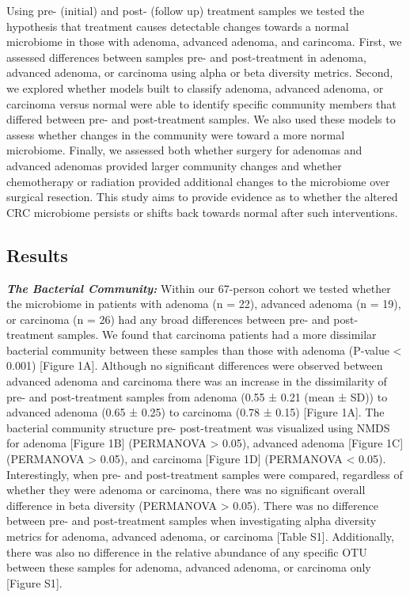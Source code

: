 \documentclass[12pt,]{article}
\begin{document}
Using pre- (initial) and post- (follow up) treatment samples we tested
the hypothesis that treatment causes detectable changes towards a normal
microbiome in those with adenoma, advanced adenoma, and carincoma.
First, we assessed differences between samples pre- and post-treatment
in adenoma, advanced adenoma, or carcinoma using alpha or beta diversity
metrics. Second, we explored whether models built to classify adenoma,
advanced adenoma, or carcinoma versus normal were able to identify
specific community members that differed between pre- and post-treatment
samples. We also used these models to assess whether changes in the
community were toward a more normal microbiome. Finally, we assessed
both whether surgery for adenomas and advanced adenomas provided larger
community changes and whether chemotherapy or radiation provided
additional changes to the microbiome over surgical resection. This study
aims to provide evidence as to whether the altered CRC microbiome
persists or shifts back towards normal after such interventions.

\newpage

\subsection{Results}\label{results}

\textbf{\emph{The Bacterial Community:}} Within our 67-person cohort we
tested whether the microbiome in patients with adenoma (n = 22),
advanced adenoma (n = 19), or carcinoma (n = 26) had any broad
differences between pre- and post-treatment samples. We found that
carcinoma patients had a more dissimilar bacterial community between
these samples than those with adenoma (P-value \textless{} 0.001)
{[}Figure 1A{]}. Although no significant differences were observed
between advanced adenoma and carcinoma there was an increase in the
dissimilarity of pre- and post-treatment samples from adenoma (0.55 ±
0.21 (mean ± SD)) to advanced adenoma (0.65 ± 0.25) to carcinoma (0.78 ±
0.15) {[}Figure 1A{]}. The bacterial community structure pre-
post-treatment was visualized using NMDS for adenoma {[}Figure 1B{]}
(PERMANOVA \textgreater{} 0.05), advanced adenoma {[}Figure 1C{]}
(PERMANOVA \textgreater{} 0.05), and carcinoma {[}Figure 1D{]}
(PERMANOVA \textless{} 0.05). Interestingly, when pre- and
post-treatment samples were compared, regardless of whether they were
adenoma or carcinoma, there was no significant overall difference in
beta diversity (PERMANOVA \textgreater{} 0.05). There was no difference
between pre- and post-treatment samples when investigating alpha
diversity metrics for adenoma, advanced adenoma, or carcinoma {[}Table
S1{]}. Additionally, there was also no difference in the relative
abundance of any specific OTU between these samples for adenoma,
advanced adenoma, or carcinoma only {[}Figure S1{]}.
\end{document}
